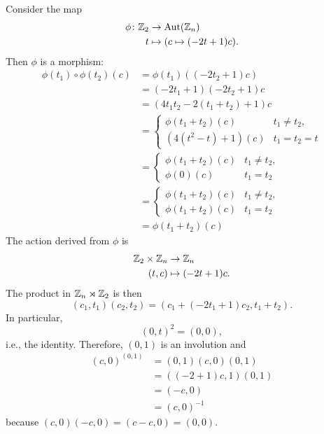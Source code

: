 \begin{xmpl}
\begin{enumerate}[\rm a)]
        Consider the map
        \begin{align*}
            \phi\colon\mathbb{Z}_2&\to{\rm Aut}(\mathbb{Z}_n)\\
            t&\mapsto(c\mapsto(-2t+1)c).
        \end{align*}
        Then $\phi$ is a morphism:
        \begin{align*}
            \phi(t_1)\circ\phi(t_2)(c) &= \phi(t_1)((-2t_2+1)c)\\
                &= (-2t_1+1)(-2t_2+1)c\\
                &= (4t_1t_2-2(t_1+t_2)+1)c\\
                &=\begin{cases}
                    \phi(t_1+t_2)(c)    &t_1\ne t_2,\\
                    (4(t^2-t)+1)(c)   &t_1=t_2=t
                \end{cases}\\
                &= \begin{cases}
                    \phi(t_1+t_2)(c)    &t_1\ne t_2,\\
                    \phi(0)(c)   &t_1=t_2
                \end{cases}\\
                &= \begin{cases}
                    \phi(t_1+t_2)(c)    &t_1\ne t_2,\\
                    \phi(t_1+t_2)(c)    &t_1=t_2
                \end{cases}\\
                &=\phi(t_1+t_2)(c)
        \end{align*}
        The action derived from $\phi$ is
        \begin{align*}
            \mathbb{Z}_2\times\mathbb{Z}_n&\to\mathbb{Z}_n\\
            (t,c)&\mapsto (-2t+1)c.
        \end{align*}
        The product in $\mathbb{Z}_n\rtimes\mathbb{Z}_2$ is then
        $$
            (c_1,t_1)(c_2,t_2) = (c_1+(-2t_1+1)c_2, t_1+t_2).
        $$
        In particular,
        $$
            (0,t)^2 = (0,0),
        $$
        i.e., the identity. Therefore, $(0,1)$ is an involution and
        \begin{align*}
            (c,0)^{(0,1)} &= (0,1)(c,0)(0,1)\\
                &= ((-2+1)c,1)(0,1)\\
                &= (-c,0)\\
                &= (c,0)^{-1}
        \end{align*}
        because $(c,0)(-c,0)=(c-c,0)=(0,0)$.


\end{enumerate}
\end{xmpl}
